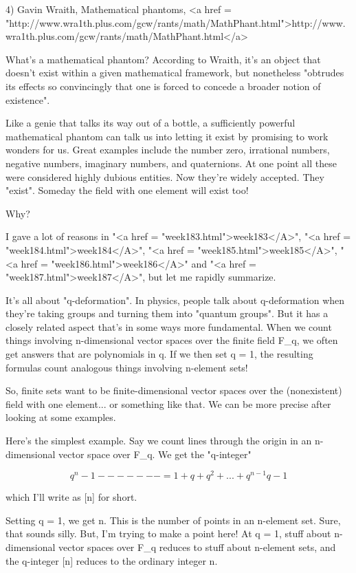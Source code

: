 4) Gavin Wraith, Mathematical phantoms,
<a href = "http://www.wra1th.plus.com/gcw/rants/math/MathPhant.html">http://www.wra1th.plus.com/gcw/rants/math/MathPhant.html</a>

What's a mathematical phantom?  According to Wraith, it's an object 
that doesn't exist within a given mathematical framework, but 
nonetheless "obtrudes its effects so convincingly that one is forced 
to concede a broader notion of existence".

Like a genie that talks its way out of a bottle, a sufficiently powerful 
mathematical phantom can talk us into letting it exist by promising to
work wonders for us.  Great examples include the number zero, irrational
numbers, negative numbers, imaginary numbers, and quaternions.  At one 
point all these were considered highly dubious entities.  Now they're
widely accepted.  They "exist".  Someday the field with one element 
will exist too!

Why?

I gave a lot of reasons in "<a href = "week183.html">week183</A>", "<a href = "week184.html">week184</A>", "<a href = "week185.html">week185</A>", "<a href = "week186.html">week186</A>" 
and "<a href = "week187.html">week187</A>", but let me rapidly summarize.  

It's all about "q-deformation".  In physics, people talk
about q-deformation when they're taking groups and turning them into
"quantum groups".  But it has a closely related aspect
that's in some ways more fundamental.  When we count things involving
n-dimensional vector spaces over the finite field F_{q}, we
often get answers that are polynomials in q.  If we then set q = 1,
the resulting formulas count analogous things involving n-element
sets!

So, finite sets want to be finite-dimensional vector spaces over the 
(nonexistent) field with one element... or something like that.  We can
be more precise after looking at some examples.

Here's the simplest example.  Say we count lines through the origin 
in an n-dimensional vector space over F_{q}.   We get the "q-integer"

$$
 q^{n} - 1
------- = 1 + q + q^{2} + ... + q^{n-1}
 q - 1
$$
    

which I'll write as [n] for short.  

Setting q = 1, we get n.  This is the number of points in an n-element
set.  Sure, that sounds silly.  But, I'm trying to make a point here!
At q = 1, stuff about n-dimensional vector spaces over F_{q}
reduces to stuff about n-element sets, and the q-integer [n] reduces
to the ordinary integer n.

